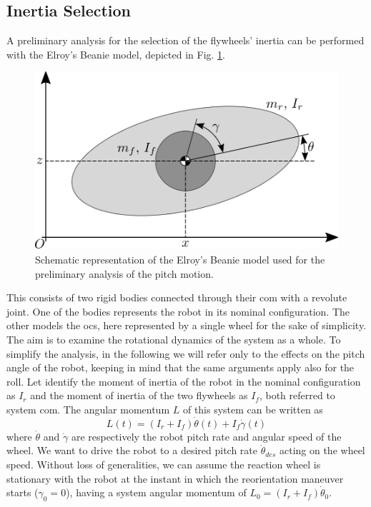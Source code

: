 \documentclass[letterpaper, 10 pt, conference]{ieeeconf}  %
\begin{document}
\subsection{Inertia Selection}
A preliminary analysis for the selection of the flywheels' inertia can be performed with the Elroy's Beanie model, depicted in Fig. \ref{fig:elroy-beanie}.
\begin{figure}
	\centering
	\includegraphics[width=.7\linewidth]{figures/elroys-beanie.eps}
	\caption{\small Schematic representation of the Elroy's Beanie model used for the preliminary analysis of the pitch motion.}
	\label{fig:elroy-beanie}
\end{figure} 
This consists of two rigid bodies connected through their \gls{com} with a revolute joint. One of the bodies represents the robot in its nominal configuration. The other models the \gls{ocs}, here represented by a single wheel for the sake of simplicity. The aim is to examine the rotational dynamics of the system as a whole. To simplify the analysis, in the following we will refer only to the effects on the pitch angle of the robot, keeping in mind that the same arguments apply also for the roll. Let identify the moment of inertia of the robot in the nominal configuration as $I_r$ and the moment of inertia of the two flywheels as $I_f$, both referred to system \gls{com}.
The angular momentum $L$ of this system can be written as
\begin{equation}\label{eq:ang_mom_elroy}
L(t) = \left(I_r + I_{f}\right)\dot{\theta}(t) + I_{f}\dot{\gamma}(t)
\end{equation}
where $\dot{\theta}$ and $\dot{\gamma}$ are respectively the robot pitch rate and angular speed of the wheel. We want to drive the robot to a desired pitch rate $\dot{\theta}_{des}$ acting on the wheel speed.
Without loss of generalities, we can assume the reaction wheel is stationary with the robot at the instant in which the reorientation maneuver starts ($\gamma_0 = 0$), having a system angular momentum of $L_0 = \left(I_r + I_{f}\right)\dot{\theta}_0$.
\end{document}
